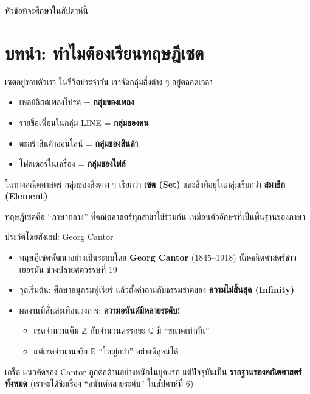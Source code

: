 \begin{frame}{หัวข้อที่จะศึกษาในสัปดาห์นี้}
  \tableofcontents
\end{frame}


\section{บทนำ: ทำไมต้องเรียนทฤษฎีเซต}

\begin{frame}{เซตอยู่รอบตัวเรา}
  ในชีวิตประจำวัน เราจัดกลุ่มสิ่งต่าง ๆ อยู่ตลอดเวลา
  \begin{itemize}
    \item เพลย์ลิสต์เพลงโปรด = \textbf{กลุ่มของเพลง}
    \item รายชื่อเพื่อนในกลุ่ม LINE = \textbf{กลุ่มของคน}
    \item ตะกร้าสินค้าออนไลน์ = \textbf{กลุ่มของสินค้า}
    \item โฟลเดอร์ในเครื่อง = \textbf{กลุ่มของไฟล์}
  \end{itemize}
  \vspace{0.5em}
  \begin{block}{ในทางคณิตศาสตร์}
    กลุ่มของสิ่งต่าง ๆ เรียกว่า \textbf{เซต (Set)} และสิ่งที่อยู่ในกลุ่มเรียกว่า \textbf{สมาชิก (Element)}
  \end{block}
  \vspace{0.4em}
  ทฤษฎีเซตคือ ``ภาษากลาง'' ที่คณิตศาสตร์ทุกสาขาใช้ร่วมกัน เหมือนตัวอักษรที่เป็นพื้นฐานของภาษา
\end{frame}

\begin{frame}{ประวัติโดยสังเขป: Georg Cantor}
  \begin{itemize}
    \item ทฤษฎีเซตพัฒนาอย่างเป็นระบบโดย \textbf{Georg Cantor} (1845--1918)
          นักคณิตศาสตร์ชาวเยอรมัน ช่วงปลายศตวรรษที่ 19
    \item จุดเริ่มต้น: ศึกษาอนุกรมฟูเรียร์ แล้วตั้งคำถามกับธรรมชาติของ \textbf{ความไม่สิ้นสุด (Infinity)}
    \item ผลงานที่สั่นสะเทือนวงการ: \textbf{ความอนันต์มีหลายระดับ!}
      \begin{itemize}
        \item เซตจำนวนเต็ม $\mathbb{Z}$ กับจำนวนตรรกยะ $\mathbb{Q}$ มี ``ขนาดเท่ากัน''
        \item แต่เซตจำนวนจริง $\mathbb{R}$ ``ใหญ่กว่า'' อย่างพิสูจน์ได้
      \end{itemize}
  \end{itemize}
  \vspace{0.4em}
  \begin{exampleblock}{เกร็ด}
    แนวคิดของ Cantor ถูกต่อต้านอย่างหนักในยุคแรก แต่ปัจจุบันเป็น \textbf{รากฐานของคณิตศาสตร์ทั้งหมด}
    (เราจะได้ชิมเรื่อง ``อนันต์หลายระดับ'' ในสัปดาห์ที่ 6)
  \end{exampleblock}
\end{frame}

